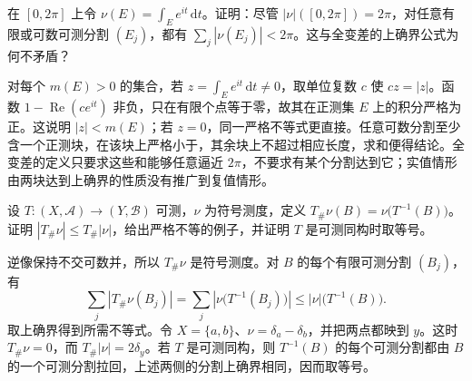\begin{optionalexercise}\label{b1:ex:06-variation-supremum}
在 \([0,2\pi]\) 上令 \(\nu(E)=\int_Ee^{it}\,\mathrm dt\)。证明：尽管 \(|\nu|([0,2\pi])=2\pi\)，对任意有限或可数可测分割 \((E_j)\)，都有 \(\sum_j|\nu(E_j)|<2\pi\)。这与全变差的上确界公式为何不矛盾？
\end{optionalexercise}
\begin{solution}
对每个 \(m(E)>0\) 的集合，若 \(z=\int_Ee^{it}\,\mathrm dt\neq0\)，取单位复数 \(c\) 使 \(cz=|z|\)。函数 \(1-\operatorname{Re}(ce^{it})\) 非负，只在有限个点等于零，故其在正测集 \(E\) 上的积分严格为正。这说明 \(|z|<m(E)\)；若 \(z=0\)，同一严格不等式更直接。任意可数分割至少含一个正测块，在该块上严格小于，其余块上不超过相应长度，求和便得结论。全变差的定义只要求这些和能够任意逼近 \(2\pi\)，不要求有某个分割达到它；实值情形由两块达到上确界的性质没有推广到复值情形。
\end{solution}

\begin{exercise}\label{b1:ex:06-pushforward-variation}
设 \(T:(X,\mathcal A)\rightarrow(Y,\mathcal B)\) 可测，\(\nu\) 为符号测度，定义 \(T_\#\nu(B)=\nu\bigl(T^{-1}(B)\bigr)\)。证明 \(|T_\#\nu|\leq T_\#|\nu|\)，给出严格不等的例子，并证明 \(T\) 是可测同构时取等号。
\end{exercise}
\begin{solution}
逆像保持不交可数并，所以 \(T_\#\nu\) 是符号测度。对 \(B\) 的每个有限可测分割 \((B_j)\)，有
\[
\sum_j|T_\#\nu(B_j)|=\sum_j|\nu\bigl(T^{-1}(B_j)\bigr)|
\leq|\nu|\bigl(T^{-1}(B)\bigr).
\]
取上确界得到所需不等式。令 \(X=\{a,b\}\)、\(\nu=\delta_a-\delta_b\)，并把两点都映到 \(y\)。这时 \(T_\#\nu=0\)，而 \(T_\#|\nu|=2\delta_y\)。若 \(T\) 是可测同构，则 \(T^{-1}(B)\) 的每个可测分割都由 \(B\) 的一个可测分割拉回，上述两侧的分割上确界相同，因而取等号。
\end{solution}

